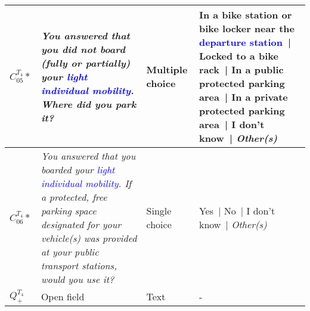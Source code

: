 \begin{table}[h!]
{\begin{tabular}{p{}p{}p{}p{}}
\hline
    \small{\(C_{05}^{T_{4}}*\)} & \small{\textsl{You answered that you did not board (fully or partially) your \textcolor{blue}{light individual mobility}. Where did you park it?}} & \small{Multiple choice} & \small{In a bike station or bike locker near the \textcolor{blue}{departure station}~| Locked to a bike rack~| In a public protected parking area~| In a private protected parking area~| I don't know~| \textsl{Other(s)}}\\
\hline
    \small{\(C_{06}^{T_{4}}*\)} & \small{\textsl{You answered that you boarded your \textcolor{blue}{light individual mobility}. If a protected, free parking space designated for your vehicle(s) was provided at your public transport stations, would you use it?}} & \small{Single choice} & \small{Yes~| No~| I don't know~| \textsl{Other(s)}}\\
\hline
    \small{\textbf{\(Q_{+}^{T_{4}}\)}} & \small{Open field} & \small{Text} & \small{-}\\
      \hline
    \end{tabular}}
    \caption*{}
    \vspace{5pt}
        \end{table}

